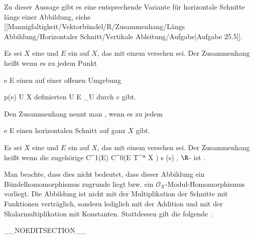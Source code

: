 Zu dieser Aussage gibt es eine entsprechende Variante für horizontale Schnitte längs einer Abbildung, siehe
[[Mannigfaltigkeit/Vektorbündel/R/Zusammenhang/Längs Abbildung/Horizontaler Schnitt/Vertikale Ableitung/Aufgabe|Aufgabe 25.5]].

{}
{

Es sei $X$ eine
und $E$ ein
auf $X$, das mit einem
versehen sei. Der Zusammenhang heißt
wenn es zu jedem Punkt

\mavergleichskette
{\vergleichskette
{ e
}
{ \in }{ E
}
{  }{
}
{    }{
}
{   }{
}
}
{}{}{}
einen auf einer offenen Umgebung

\mavergleichskette
{\vergleichskette
{ p(e)
}
{ \in }{ U
}
{ \subseteq }{ X
}
{    }{
}
{   }{
}
}
{}{}{}
definierten
 { U } { E  \vert_U
} {}
durch $e$ gibt.

}
Den Zusammenhang nennt man  {,} wenn es zu jedem

\mavergleichskette
{\vergleichskette
{ e
}
{ \in }{ E
}
{  }{
}
{    }{
}
{   }{
}
}
{}{}{}
einen horizontalen Schnitt auf ganz $X$ gibt.


{}
{

Es sei $X$ eine
und $E$ ein
auf $X$, das mit einem
versehen sei. Der Zusammenhang heißt
wenn die zugehörige
\maabbeledisp {\nabla} {C^1(E)} { C^0(E \otimes T^* X )
} { s } { \nabla(s)
} {,}
$\R$-
ist
 {} {.}

}

Man beachte, dass dies nicht bedeutet, dass dieser Abbildung ein Bündelhomomorphismus zugrunde liegt bzw. ein ${\mathcal O}_X$-Modul-Homomorphismus vorliegt. Die Abbildung ist nicht mit der Multiplikation der Schnitte mit Funktionen verträglich, sondern lediglich mit der Addition und mit der Skalarmultiplikation mit Konstanten. Stattdessen gilt die folgende  {.}

__NOEDITSECTION__

